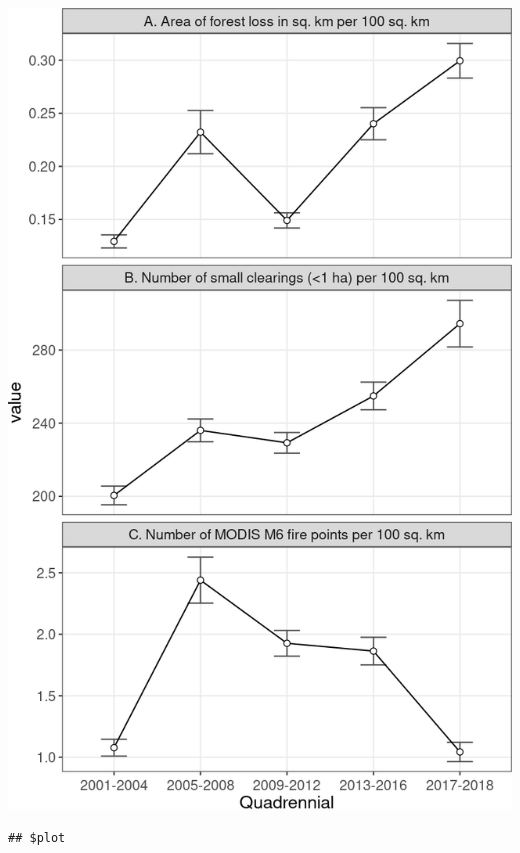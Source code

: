 \documentclass[10pt,landscape,a3paper]{article}
\begin{document}
\begin{center}\includegraphics{img/modelling/aa-eda-ts-13} \end{center}

\begin{verbatim}
## $plot
\end{verbatim}
\end{document}
